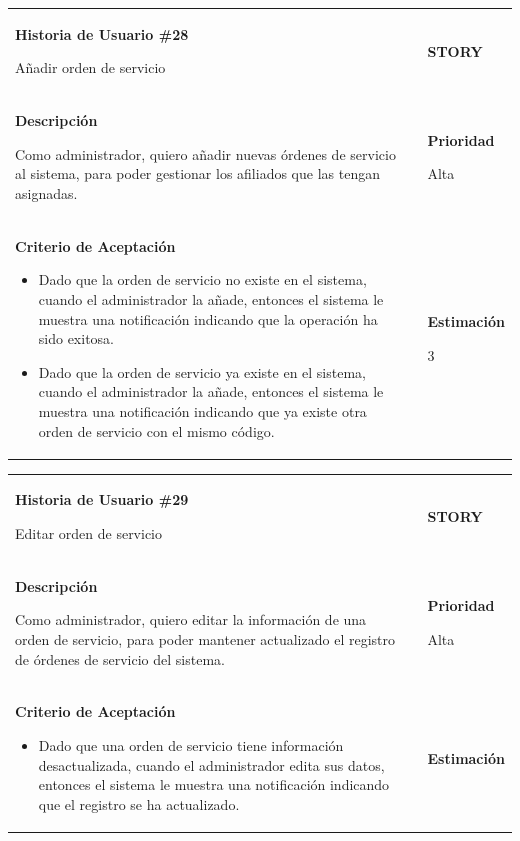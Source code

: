 \documentclass[12pt,a4paper]{article}
\begin{document}
\begin{center}
\begin{tabular}{| p{10cm} c p{2.5cm}|}
\hline 
\textbf{Historia de Usuario \#28}

Añadir orden de servicio & & \textbf{{\Large STORY}} \\ 
\textbf{Descripción}

Como administrador, quiero añadir nuevas órdenes de servicio al sistema, para
poder gestionar los afiliados que las tengan asignadas. &  & \textbf{Prioridad}

Alta\\

\textbf{Criterio de Aceptación}

\begin{itemize}
\item Dado que la orden de servicio no existe en el sistema, cuando el
administrador la añade, entonces el sistema le muestra una
notificación indicando que la operación ha sido exitosa.
\item Dado que la orden de servicio ya existe en el sistema, cuando el
administrador la añade, entonces el sistema le muestra una
notificación indicando que ya existe otra orden de servicio con el mismo
código.
\end{itemize} & & \textbf{Estimación}

3 \\ 
\hline 
\end{tabular}
\vspace{5mm}

\begin{tabular}{| p{10cm} c p{2.5cm}|}
\hline 
\textbf{Historia de Usuario \#29}

Editar orden de servicio & & \textbf{{\Large STORY}} \\ 
\textbf{Descripción}

Como administrador, quiero editar la información de una orden de servicio, para
poder mantener actualizado el registro de órdenes de servicio del sistema. &  & \textbf{Prioridad}

Alta\\

\textbf{Criterio de Aceptación}

\begin{itemize}
\item Dado que una orden de servicio tiene información desactualizada, cuando
el administrador edita sus datos, entonces el sistema le muestra
una notificación indicando que el registro se ha actualizado.
\end{itemize} & & \textbf{Estimación}


\end{tabular}
\end{center}
\end{document}
